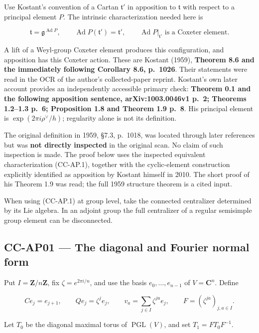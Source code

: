 \documentclass[11pt,a4paper]{article}
\theoremstyle{definition}\newtheorem{definition}[theorem]{Definition}
\theoremstyle{remark}\newtheorem{remark}[theorem]{Remark}
\begin{document}
Use Kostant's convention of a Cartan \(\mathfrak t'\) in apposition to
\(\mathfrak t\) with respect to a principal element \(P\). The intrinsic
characterization needed here is

\[
 \mathfrak t=\mathfrak g^{\operatorname{Ad}P},
 \qquad
 \operatorname{Ad}P(\mathfrak t')=\mathfrak t',
 \qquad
 \operatorname{Ad}P|_{\mathfrak t'}\text{ is a Coxeter element}.
 \tag{CC-AP.1}
\]

A lift of a Weyl-group Coxeter element produces this configuration, and
apposition has this Coxeter action. These are Kostant (1959),
\textbf{Theorem 8.6 and the immediately following Corollary 8.6,
p.~1026}. Their statements were read in the OCR of the author's
collected-paper reprint. Kostant's own later account provides an
independently accessible primary check: \textbf{Theorem 0.1 and the
following apposition sentence, arXiv:1003.0046v1 p.~2; Theorems 1.2--1.3
p.~6; Proposition 1.8 and Theorem 1.9 p.~8}. His principal element is
\(\exp(2\pi i\rho^\vee/h)\); regularity alone is not its definition.

The original definition in 1959, §7.3, p.~1018, was located through
later references but was \textbf{not directly inspected} in the original
scan. No claim of such inspection is made. The proof below uses the
inspected equivalent characterization (CC-AP.1), together with the
cyclic-element construction explicitly identified as apposition by
Kostant himself in 2010. The short proof of his Theorem 1.9 was read;
the full 1959 structure theorem is a cited input.

When using (CC-AP.1) at group level, take the connected centralizer
determined by its Lie algebra. In an adjoint group the full centralizer
of a regular semisimple group element can be disconnected.

\subsection{CC-AP01 --- The diagonal and Fourier normal
form}\label{cc-ap01-the-diagonal-and-fourier-normal-form}

Put \(I=\mathbf Z/n\mathbf Z\), fix \(\zeta=e^{2\pi i/n}\), and use the
basis \(e_0,\ldots,e_{n-1}\) of \(V=\mathbf C^n\). Define

\[
 C e_j=e_{j+1},\qquad
 Qe_j=\zeta^j e_j,\qquad
 v_a=\sum_{j\in I}\zeta^{ja}e_j,
 \qquad F=(\zeta^{ja})_{j,a\in I}.
\]

Let \(T_0\) be the diagonal maximal torus of \(\operatorname{PGL}(V)\),
and set \(T_1=FT_0F^{-1}\).
\end{document}
